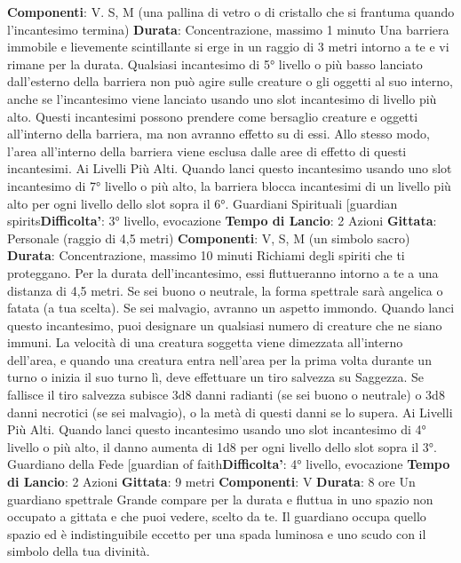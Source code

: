 \begin{multicols}{2}
\textbf{Componenti}: V. S, M (una pallina di vetro o di cristallo
che si frantuma quando l’incantesimo termina)
\textbf{Durata}: Concentrazione, massimo 1 minuto
Una barriera immobile e lievemente scintillante si erge
in un raggio di 3 metri intorno a te e vi rimane per la
durata.
Qualsiasi incantesimo di 5° livello o più basso lanciato
dall’esterno della barriera non può agire sulle creature o
gli oggetti al suo interno, anche se l’incantesimo viene
lanciato usando uno slot incantesimo di livello più alto.
Questi incantesimi possono prendere come bersaglio
creature e oggetti all’interno della barriera, ma non
avranno effetto su di essi. Allo stesso modo, l’area
all’interno della barriera viene esclusa dalle aree di
effetto di questi incantesimi.
Ai Livelli Più Alti. Quando lanci questo incantesimo
usando uno slot incantesimo di 7° livello o più alto, la
barriera blocca incantesimi di un livello più alto per ogni
livello dello slot sopra il 6°.
Guardiani Spirituali
[guardian spirits\textbf{Difficolta'}:
3° livello, evocazione
\textbf{Tempo di Lancio}: 2 Azioni
\textbf{Gittata}: Personale (raggio di 4,5 metri)
\textbf{Componenti}: V, S, M (un simbolo sacro)
\textbf{Durata}: Concentrazione, massimo 10 minuti
Richiami degli spiriti che ti proteggano. Per la durata
dell’incantesimo, essi fluttueranno intorno a te a una
distanza di 4,5 metri. Se sei buono o neutrale, la forma
spettrale sarà angelica o fatata (a tua scelta). Se sei
malvagio, avranno un aspetto immondo.
Quando lanci questo incantesimo, puoi designare un
qualsiasi numero di creature che ne siano immuni. La
velocità di una creatura soggetta viene dimezzata
all’interno dell’area, e quando una creatura entra
nell’area per la prima volta durante un turno o inizia il
suo turno lì, deve effettuare un tiro salvezza su
Saggezza. Se fallisce il tiro salvezza subisce 3d8 danni
radianti (se sei buono o neutrale) o 3d8 danni necrotici
(se sei malvagio), o la metà di questi danni se lo
supera.
Ai Livelli Più Alti. Quando lanci questo incantesimo
usando uno slot incantesimo di 4° livello o più alto, il
danno aumenta di 1d8 per ogni livello dello slot sopra il
3°.
Guardiano della Fede
[guardian of faith\textbf{Difficolta'}:
4° livello, evocazione
\textbf{Tempo di Lancio}: 2 Azioni
\textbf{Gittata}: 9 metri
\textbf{Componenti}: V
\textbf{Durata}: 8 ore
Un guardiano spettrale Grande compare per la durata e
fluttua in uno spazio non occupato a gittata e che puoi
vedere, scelto da te. Il guardiano occupa quello spazio
ed è indistinguibile eccetto per una spada luminosa e
uno scudo con il simbolo della tua divinità.

\end{multicols}
